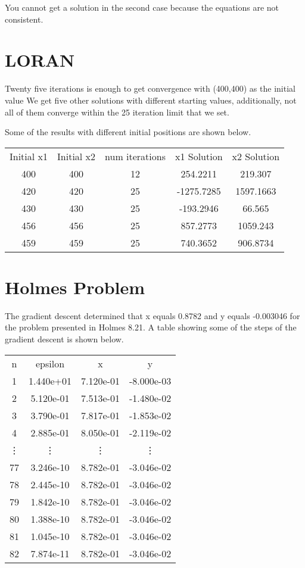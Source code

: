 \documentclass{article}
\begin{document}
You cannot get a solution in the second case because the equations are not consistent. 

\section{LORAN}

Twenty five iterations is enough to get convergence with (400,400) as the initial value We get five other solutions with different starting values, additionally, not all of them converge within the 25 iteration limit that we set.

Some of the results with different initial positions are shown below.
\begin{center}
\begin{tabular}{ccccc}
Initial x1 & Initial x2 & num iterations & x1 Solution & x2 Solution\\
400 & 400 & 12 & 254.2211 & 219.307\\
420 & 420 & 25 & -1275.7285 & 1597.1663\\
430 & 430 & 25 & -193.2946 & 66.565\\
456 & 456 & 25 & 857.2773 & 1059.243\\
459 & 459 & 25 & 740.3652 & 906.8734
\end{tabular}

\end{center}


\section{Holmes Problem}

The gradient descent determined that x equals 0.8782 and y equals -0.003046 for the problem presented in Holmes 8.21. A table showing some of the steps of the gradient descent is shown below.
\begin{center}
\begin{tabular}{cccc}
n & epsilon & x & y \\
 1 & 1.440e+01 & 7.120e-01 & -8.000e-03\\ 
 2 & 5.120e-01 & 7.513e-01 & -1.480e-02\\ 
 3 & 3.790e-01 & 7.817e-01 & -1.853e-02\\ 
 4 & 2.885e-01 & 8.050e-01 & -2.119e-02\\ 
  \vdots &   \vdots &   \vdots &   \vdots \\
 77 & 3.246e-10 & 8.782e-01 & -3.046e-02\\ 
 78 & 2.445e-10 & 8.782e-01 & -3.046e-02\\ 
 79 & 1.842e-10 & 8.782e-01 & -3.046e-02\\ 
 80 & 1.388e-10 & 8.782e-01 & -3.046e-02\\ 
 81 & 1.045e-10 & 8.782e-01 & -3.046e-02\\ 
 82 & 7.874e-11 & 8.782e-01 & -3.046e-02
\end{tabular}

\end{center}
\end{document}
